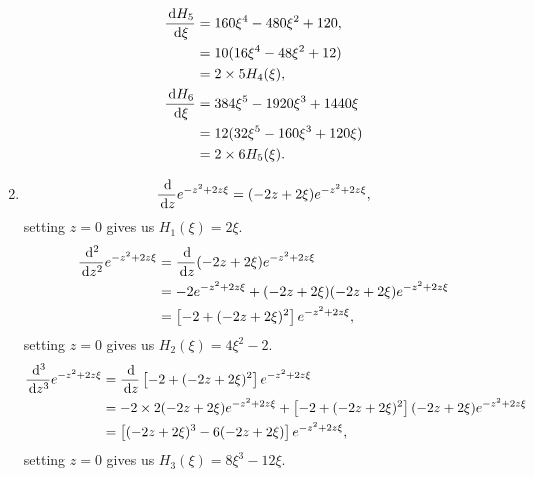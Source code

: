 \documentclass[en, oneside]{vivi}
\begin{document}
\begin{sol}
\begin{enumerate}[label=(\alph*)]
\begin{align*}
            \frac{\dif H_5}{\dif \xi} &= 160\xi^4 - 480\xi^2 + 120,\\
            &= 10(16\xi^4 - 48\xi^2 + 12)\\
            &= 2 \times 5 H_4(\xi),\\
            \frac{\dif H_6}{\dif \xi} &= 384\xi^5 - 1920\xi^3 + 1440\xi\\
            &= 12 (32\xi^5 - 160\xi^3 + 120\xi)\\
            &= 2 \times 6 H_5(\xi).
        \end{align*}
        \item \begin{equation*}
            \frac{\dif}{\dif z} e^{-z^2 + 2z\xi} = (-2z + 2\xi) e^{-z^2 + 2z\xi},
        \end{equation*}
        setting $z = 0$ gives us $H_1(\xi) = 2\xi$.
        \begin{align*}
            \frac{\dif^2}{\dif z^2} e^{-z^2 + 2z\xi} &= \frac{\dif}{\dif z} (-2z + 2\xi) e^{-z^2 + 2z\xi}\\
            &= -2 e^{-z^2 + 2z\xi} + (-2z + 2\xi)(-2z + 2\xi) e^{-z^2 + 2z\xi}\\
            &= \left[ -2 + (-2z + 2\xi)^2 \right] e^{-z^2 + 2z\xi},
        \end{align*}
        setting $z = 0$ gives us $H_2(\xi) = 4\xi^2 - 2$.
        \begin{align*}
            \frac{\dif^3}{\dif z^3} e^{-z^2 + 2z\xi} &= \frac{\dif}{\dif z} \left[ -2 + (-2z + 2\xi)^2 \right] e^{-z^2 + 2z\xi}\\
            &= -2 \times 2(-2z + 2\xi) e^{-z^2 + 2z\xi} + \left[ -2 + (-2z + 2\xi)^2 \right] (-2z + 2\xi) e^{-z^2 + 2z\xi}\\
            &= \left[ (-2z + 2\xi)^3 - 6(-2z + 2\xi) \right] e^{-z^2 + 2z\xi},
        \end{align*}
        setting $z = 0$ gives us $H_3(\xi) = 8\xi^3 - 12\xi$.
    \end{enumerate}
\end{sol}
\end{document}
